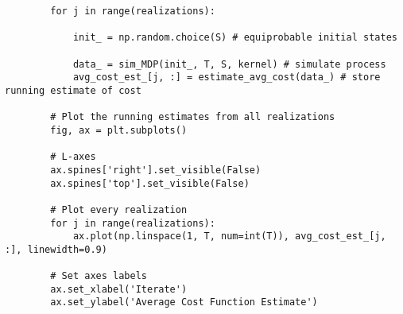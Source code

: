 \documentclass[11pt, letterpaper]{article}
\begin{document}
\begin{verbatim}
        for j in range(realizations):
            
            init_ = np.random.choice(S) # equiprobable initial states

            data_ = sim_MDP(init_, T, S, kernel) # simulate process
            avg_cost_est_[j, :] = estimate_avg_cost(data_) # store running estimate of cost

        # Plot the running estimates from all realizations
        fig, ax = plt.subplots()

        # L-axes
        ax.spines['right'].set_visible(False)
        ax.spines['top'].set_visible(False)

        # Plot every realization
        for j in range(realizations):
            ax.plot(np.linspace(1, T, num=int(T)), avg_cost_est_[j, :], linewidth=0.9)

        # Set axes labels
        ax.set_xlabel('Iterate')
        ax.set_ylabel('Average Cost Function Estimate')
    \end{verbatim}
\end{document}
